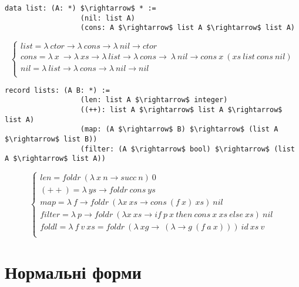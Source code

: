 \begin{lstlisting}[mathescape=true]
             data list: (A: *) $\rightarrow$ * :=
                  (nil: list A)
                  (cons: A $\rightarrow$ list A $\rightarrow$ list A)
\end{lstlisting}
$$
\begin{cases}
list = \lambda\ ctor \rightarrow \lambda\ cons \rightarrow \lambda\ nil \rightarrow ctor\\
cons = \lambda\ x\ \rightarrow \lambda\ xs \rightarrow \lambda\ list \rightarrow \lambda\ cons \rightarrow\ \lambda\ nil \rightarrow cons\ x\ (xs\ list\ cons\ nil)\\
nil = \lambda\ list \rightarrow \lambda\ cons \rightarrow \lambda\ nil \rightarrow nil\\
\end{cases}
$$
\begin{lstlisting}[mathescape=true]
           record lists: (A B: *) :=
                  (len: list A $\rightarrow$ integer)
                  ((++): list A $\rightarrow$ list A $\rightarrow$ list A)
                  (map: (A $\rightarrow$ B) $\rightarrow$ (list A $\rightarrow$ list B))
                  (filter: (A $\rightarrow$ bool) $\rightarrow$ (list A $\rightarrow$ list A))
\end{lstlisting}
$$
\begin{cases}
len = foldr\ (\lambda\ x\ n \rightarrow succ\ n)\ 0\\
(++) = \lambda\ ys \rightarrow foldr\ cons\ ys\\
map = \lambda\ f \rightarrow foldr\ (\lambda x\ xs \rightarrow cons\ (f\ x)\ xs)\ nil\\
filter = \lambda\ p \rightarrow foldr\ (\lambda x\ xs \rightarrow if\ p\ x\ then\ cons\ x\ xs\ else\ xs)\ nil\\
foldl = \lambda\ f\ v\ xs = foldr\ (\lambda\ xg\rightarrow\ (\lambda \rightarrow g\ (f\ a\ x)))\ id\ xs\ v\\
\end{cases}
$$

\vspace{1cm}
\section{Нормальні форми}

